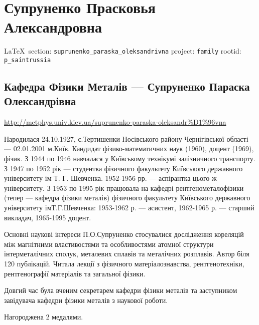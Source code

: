  
 
\section{Супруненко Прасковья Александровна}
  
\vspace{0.5cm}
 {\ifDEBUG\small\LaTeX~section: \verb|suprunenko_paraska_oleksandrivna| project: \verb|family| rootid: \verb|p_saintrussia| \fi}
\vspace{0.5cm}

\subsection{Кафедра Фізики Металів --- Супруненко Параска Олександрівна}
\url{http://metphys.univ.kiev.ua/suprunenko-paraska-oleksandr%D1%96vna}

Народилася 24.10.1927, с.Тертишенки Носівського району Чернігівської області ---
02.01.2001 м.Київ. Кандидат фізико-математичних наук (1960), доцент (1969),
фізик. З 1944 по 1946 навчалася у Київському технікумі залізничного транспорту.
З 1947 по 1952 рік --- студентка фізичного факультету Київського державного
університету ім Т. Г. Шевченка. 1952-1956 рр. --- аспірантка цього ж університету. З
1953 по 1995 рік працювала на кафедрі рентгенометалофізики (тепер --- кафедра
фізики металів) фізичного факультету Київського державного університету
імТ.Г.Шевченка: 1953-1962 р. --- асистент, 1962-1965 р. --- старший викладач,
1965-1995 доцент.

Основні наукові інтереси П.О.Супруненко стосувалися дослідження кореляцій між
магнітними властивостями та особливостями атомної структури інтерметалічних
сполук, металевих сплавів та металічних розплавів. Автор біля 120 публікацій.
Читала лекції з фізичного матеріалознавства, рентгенотехніки, рентгенографії
матеріалів та загальної фізики.

Довгий час була вченим секретарем кафедри фізики металів та заступником
завідувача кафедри фізики металів з наукової роботи.

Нагороджена 2 медалями.

  
